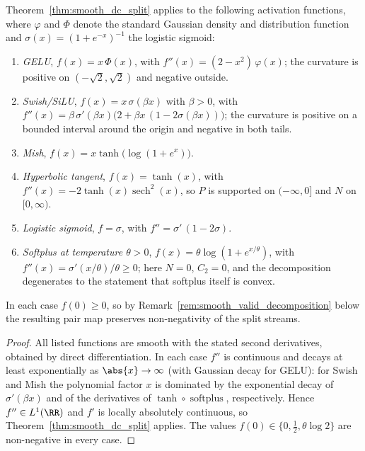 \begin{corollary}\label{cor:modern_activations}
Theorem~\ref{thm:smooth_dc_split} applies to the following activation functions, where $\varphi$ and $\Phi$ denote the standard Gaussian density and distribution function and $\sigma(x) = (1+e^{-x})^{-1}$ the logistic sigmoid:
\begin{enumerate}
	\item \emph{GELU}, $f(x) = x\,\Phi(x)$, with $f''(x) = (2 - x^2)\,\varphi(x)$; the curvature is positive on $(-\sqrt{2}, \sqrt{2})$ and negative outside.
	\item \emph{Swish/SiLU}, $f(x) = x\,\sigma(\beta x)$ with $\beta > 0$, with $f''(x) = \beta\,\sigma'(\beta x)\bigl( 2 + \beta x\,(1 - 2\sigma(\beta x)) \bigr)$; the curvature is positive on a bounded interval around the origin and negative in both tails.
	\item \emph{Mish}, $f(x) = x \tanh\bigl(\log(1 + e^{x})\bigr)$.
	\item \emph{Hyperbolic tangent}, $f(x) = \tanh(x)$, with $f''(x) = -2 \tanh(x)\operatorname{sech}^2(x)$, so $P$ is supported on $(-\infty, 0]$ and $N$ on $[0, \infty)$.
	\item \emph{Logistic sigmoid}, $f = \sigma$, with $f'' = \sigma'\,(1 - 2\sigma)$.
	\item \emph{Softplus at temperature $\theta > 0$}, $f(x) = \theta \log(1 + e^{x/\theta})$, with $f''(x) = \sigma'(x/\theta)/\theta \ge 0$; here $N = 0$, $C_2 = 0$, and the decomposition degenerates to the statement that softplus itself is convex.
\end{enumerate}
In each case $f(0) \ge 0$, so by Remark~\ref{rem:smooth_valid_decomposition} below the resulting pair map preserves non-negativity of the split streams.
\hfill{}
\end{corollary}

\begin{proof}
All listed functions are smooth with the stated second derivatives, obtained by direct differentiation. In each case $f''$ is continuous and decays at least exponentially as $\abs{x} \to \infty$ (with Gaussian decay for GELU): for Swish and Mish the polynomial factor $x$ is dominated by the exponential decay of $\sigma'(\beta x)$ and of the derivatives of $\tanh \circ \operatorname{softplus}$, respectively. Hence $f'' \in L^1(\RR)$ and $f'$ is locally absolutely continuous, so Theorem~\ref{thm:smooth_dc_split} applies. The values $f(0) \in \{0, \tfrac{1}{2}, \theta \log 2\}$ are non-negative in every case.
\end{proof}

